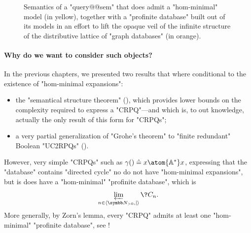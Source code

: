 \begin{figure}
	\centering
	\caption{\AP\label{fig:poset-reldb-profinite}
	Semantics of a "query@@sem" that does admit a "hom-minimal" model
	(in yellow),
	together with a "profinite database" built out of its models
	in an effort to lift the opaque veil of the infinite structure of the distributive lattice
	of "graph databases" (in orange).
	}
\end{figure}

\paragraph{Why do we want to consider such objects?}
In the previous chapters, we presented two results that where conditional
to the existence of "hom-minimal expansions":
\begin{itemize}
	\item the "semantical structure theorem" (), which
		provides lower bounds on the complexity required to express a "CRPQ"---and which is,
		to out knowledge, actually the only result of this form for "CRPQs";
	\item a very partial generalization of "Grohe's theorem" to
		"finite redundant" Boolean "UC2RPQs" ().
\end{itemize}
However, very simple "CRPQs" such as $\gamma() \defeq x \atom{\A^*} x$,
expressing that the "database" contains "directed cycle" no do not
have "hom-minimal expansions", but is does have a "hom-minimal" 
"profinite database", which is \[\varprojlim\limits_{n\in\tup{\Np,\mid}} \?C_{n}.\]
More generally, by Zorn's lemma, every "CRPQ" admits at least 
one "hom-minimal" "profinite database", see !

